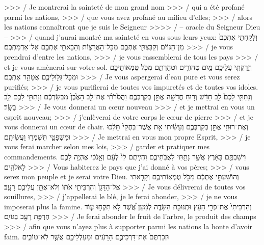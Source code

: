 \begin{paracol}[1]
  {>>> / Je montrerai la sainteté de mon grand nom
    >>> / qui a été profané parmi les nations,
    >>> / que vous avez profané au milieu d’elles;
    >>> / alors les nations connaîtront que je suis le Seigneur
    >>>> / – oracle du Seigneur Dieu –
    >>> / quand j’aurai montré ma sainteté en vous sous leurs yeux:}
  \verset
  {וְלָקַחְתִּ֤י אֶתְכֶם֙ מִן־הַגּוֹיִ֔ם
    וְקִבַּצְתִּ֥י אֶתְכֶ֖ם מִכָּל־הָאֲרָצ֑וֹת
    וְהֵבֵאתִ֥י אֶתְכֶ֖ם אֶל־אַדְמַתְכֶֽם׃}
  {>>> / je vous prendrai d’entre les nations,
    >>> / je vous rassemblerai de tous les pays
    >>> / et je vous amènerai sur votre sol.}
  \verset
  {וְזָרַקְתִּ֧י עֲלֵיכֶ֛ם מַ֥יִם טְהוֹרִ֖ים וּטְהַרְתֶּ֑ם
    מִכֹּ֧ל טֻמְאוֹתֵיכֶ֛ם וּמִכָּל־גִּלּ֥וּלֵיכֶ֖ם אֲטַהֵ֥ר אֶתְכֶֽם׃}
  {>>> / Je vous aspergerai d’eau pure et vous serez purifiés;
    >>> / je vous purifierai de toutes vos impuretés et de toutes vos idoles.}
  \verset
  {וְנָתַתִּ֤י לָכֶם֙ לֵ֣ב חָדָ֔שׁ
    וְר֥וּחַ חֲדָשָׁ֖ה אֶתֵּ֣ן בְּקִרְבְּכֶ֑ם
    וַהֲסִ֙רֹתִ֜י אֶת־לֵ֤ב הָאֶ֙בֶן֙ מִבְּשַׂרְכֶ֔ם
    וְנָתַתִּ֥י לָכֶ֖ם לֵ֥ב בָּשָֽׂר׃}
  {>>> / Je vous donnerai un cœur nouveau
    >>> / et je mettrai en vous un esprit nouveau;
    >>> / j’enlèverai de votre corps le cœur de pierre
    >>> / et je vous donnerai un cœur de chair.}
  \verset
  {וְאֶת־רוּחִ֖י אֶתֵּ֣ן בְּקִרְבְּכֶ֑ם
    וְעָשִׂ֗יתִי אֵ֤ת אֲשֶׁר־בְּחֻקַּי֙ תֵּלֵ֔כוּ
    וּמִשְׁפָּטַ֥י תִּשְׁמְר֖וּ וַעֲשִׂיתֶֽם׃}
  {>>> / Je mettrai en vous mon propre Esprit,
    >>> / je vous ferai marcher selon mes lois,
    >>> / garder et pratiquer mes commandements.}
  \verset
  {וִישַׁבְתֶּ֣ם בָּאָ֔רֶץ אֲשֶׁ֥ר נָתַ֖תִּי לַאֲבֹֽתֵיכֶ֑ם
    וִהְיִ֤יתֶם לִי֙ לְעָ֔ם וְאָ֣נֹכִ֔י אֶהְיֶ֥ה לָכֶ֖ם לֵאלֹהִֽים׃}
  {>>> / Vous habiterez le pays que j’ai donné à vos pères;
    >>> / vous serez mon peuple et je serai votre Dieu.}
  \verset
  {וְהוֹשַׁעְתִּ֣י אֶתְכֶ֔ם מִכֹּ֖ל טֻמְאֽוֹתֵיכֶ֑ם
    וְקָרָ֤אתִי אֶל־הַדָּגָן֙ וְהִרְבֵּיתִ֣י אֹת֔וֹ
    וְלֹא־אֶתֵּ֥ן עֲלֵיכֶ֖ם רָעָֽב׃}
  {>>> / Je vous délivrerai de toutes vos souillures,
    >>> / j’appellerai le blé, je le ferai abonder,
    >>> / je ne vous imposerai plus la famine.}
  \verset
  {וְהִרְבֵּיתִי֙ אֶת־פְּרִ֣י הָעֵ֔ץ וּתְנוּבַ֖ת הַשָּׂדֶ֑ה לְמַ֗עַן
    אֲ֠שֶׁר לֹ֣א תִקְח֥וּ ע֛וֹד חֶרְפַּ֥ת רָעָ֖ב בַּגּוֹיִֽם׃}
  {>>> / Je ferai abonder le fruit de l’arbre, le produit des champs
    >>> / afin que vous n’ayez plus à supporter parmi les nations la honte d’avoir faim.}
  \verset
  {וּזְכַרְתֶּם֙ אֶת־דַּרְכֵיכֶ֣ם הָרָעִ֔ים
    וּמַעַלְלֵיכֶ֖ם אֲשֶׁ֣ר לֹֽא־טוֹבִ֑ים
}
\end{paracol}
